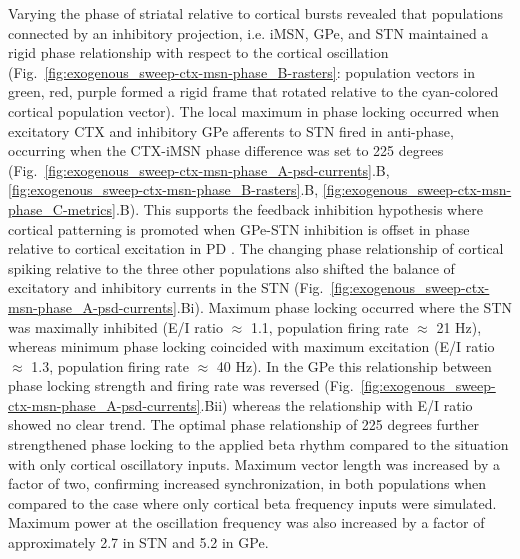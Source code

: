 %
Varying the phase of striatal relative to cortical bursts revealed that populations connected by an inhibitory projection, i.e. iMSN, GPe, and STN maintained a rigid phase relationship with respect to the cortical oscillation (Fig.~\ref{fig:exogenous_sweep-ctx-msn-phase_B-rasters}: population vectors in green, red, purple formed a rigid frame that rotated relative to the cyan-colored cortical population vector). The local maximum in phase locking occurred when excitatory CTX and inhibitory GPe afferents to STN fired in anti-phase, occurring when the CTX-iMSN phase difference was set to 225 degrees (Fig.~\ref{fig:exogenous_sweep-ctx-msn-phase_A-psd-currents}.B, \ref{fig:exogenous_sweep-ctx-msn-phase_B-rasters}.B, \ref{fig:exogenous_sweep-ctx-msn-phase_C-metrics}.B). This supports the feedback inhibition hypothesis where cortical patterning is promoted when GPe-STN inhibition is offset in phase relative to cortical excitation in PD \cite{baufreton_enhancement_2005,mallet_parkinsonian_2008,mallet_dichotomous_2012}. The changing phase relationship of cortical spiking relative to the three other populations also shifted the balance of excitatory and inhibitory currents in the STN (Fig.~\ref{fig:exogenous_sweep-ctx-msn-phase_A-psd-currents}.Bi). Maximum phase locking occurred where the STN was maximally inhibited (E/I ratio $\approx$ 1.1, population firing rate $\approx$ 21 Hz), whereas minimum phase locking coincided with maximum excitation (E/I ratio $\approx$ 1.3, population firing rate $\approx$ 40 Hz). In the GPe this relationship between phase locking strength and firing rate was reversed (Fig.~\ref{fig:exogenous_sweep-ctx-msn-phase_A-psd-currents}.Bii) whereas the relationship with E/I ratio showed no clear trend. The optimal phase relationship of 225 degrees further strengthened phase locking to the applied beta rhythm compared to the situation with only cortical oscillatory inputs. Maximum vector length was increased by a factor of two, confirming increased synchronization, in both populations when compared to the case where only cortical beta frequency inputs were simulated. Maximum power at the oscillation frequency was also increased by a factor of approximately 2.7 in STN and 5.2 in GPe.
%
%
%
%
%
%
%
%
%
%
%
%
%
%
%


%

